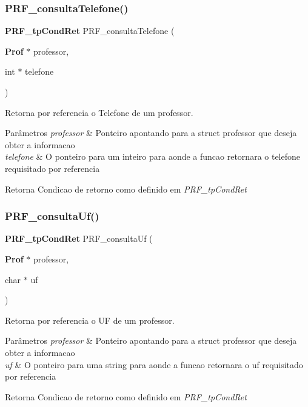 \subsubsection{P\+R\+F\+\_\+consulta\+Telefone()}
{\footnotesize\ttfamily \textbf{ P\+R\+F\+\_\+tp\+Cond\+Ret} P\+R\+F\+\_\+consulta\+Telefone (\begin{DoxyParamCaption}\item[{\textbf{ Prof} $\ast$}]{professor,  }\item[{int $\ast$}]{telefone }\end{DoxyParamCaption})}



Retorna por referencia o Telefone de um professor. 


\begin{DoxyParams}{Parâmetros}
{\em professor} & Ponteiro apontando para a struct professor que deseja obter a informacao \\
\hline
{\em telefone} & O ponteiro para um inteiro para aonde a funcao retornara o telefone requisitado por referencia \\
\hline
\end{DoxyParams}
\begin{DoxyReturn}{Retorna}
Condicao de retorno como definido em {\itshape P\+R\+F\+\_\+tp\+Cond\+Ret} 
\end{DoxyReturn}
\mbox{\label{group__modulo_professor_gacda7cddf718a46f03b278817100758c2}} 
\subsubsection{P\+R\+F\+\_\+consulta\+Uf()}
{\footnotesize\ttfamily \textbf{ P\+R\+F\+\_\+tp\+Cond\+Ret} P\+R\+F\+\_\+consulta\+Uf (\begin{DoxyParamCaption}\item[{\textbf{ Prof} $\ast$}]{professor,  }\item[{char $\ast$}]{uf }\end{DoxyParamCaption})}



Retorna por referencia o UF de um professor. 


\begin{DoxyParams}{Parâmetros}
{\em professor} & Ponteiro apontando para a struct professor que deseja obter a informacao \\
\hline
{\em uf} & O ponteiro para uma string para aonde a funcao retornara o uf requisitado por referencia \\
\hline
\end{DoxyParams}
\begin{DoxyReturn}{Retorna}
Condicao de retorno como definido em {\itshape P\+R\+F\+\_\+tp\+Cond\+Ret} 
\end{DoxyReturn}
\mbox{\label{group__modulo_professor_ga1da45b9827b6feedfee37ce1233032e9}} 
